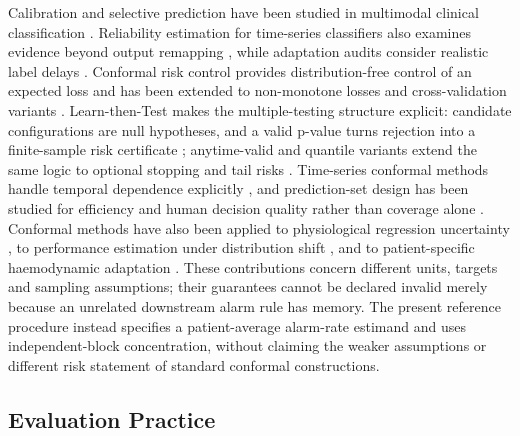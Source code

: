 Calibration and selective prediction have been studied in multimodal clinical classification \citep{lpez2026empirical}. Reliability estimation for time-series classifiers also examines evidence beyond output remapping \citep{cenacchi2026beyond}, while adaptation audits consider realistic label delays \citep{fentazi2026training}. Conformal risk control provides distribution-free control of an expected loss and has been extended to non-monotone losses and cross-validation variants \citep{angelopoulos2022conformal,angelopoulos2026conformal,cohen2024crossvalidation}. Learn-then-Test makes the multiple-testing structure explicit: candidate configurations are null hypotheses, and a valid p-value turns rejection into a finite-sample risk certificate \citep{angelopoulos2021learn}; anytime-valid and quantile variants extend the same logic to optional stopping and tail risks \citep{hultberg2026anytimevalid,farzaneh2024quantile}. Time-series conformal methods handle temporal dependence explicitly \citep{angelopoulos2023conformal,english2024janet,lin2022conformal}, and prediction-set design has been studied for efficiency and human decision quality rather than coverage alone \citep{kiyani2024length,cresswell2024conformal}. Conformal methods have also been applied to physiological regression uncertainty \citep{strickland2025degrees}, to performance estimation under distribution shift \citep{lu2022estimating}, and to patient-specific haemodynamic adaptation \citep{li2026crosssample}. These contributions concern different units, targets and sampling assumptions; their guarantees cannot be declared invalid merely because an unrelated downstream alarm rule has memory. The present reference procedure instead specifies a patient-average alarm-rate estimand and uses independent-block concentration, without claiming the weaker assumptions or different risk statement of standard conformal constructions.

\subsection{Evaluation Practice}

